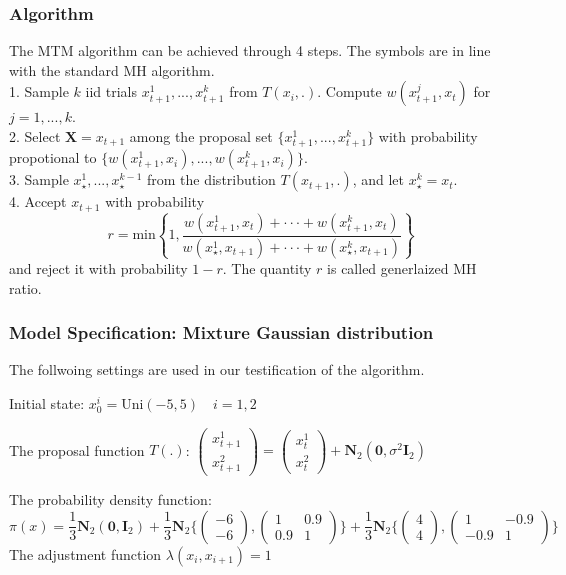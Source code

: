 \documentclass{article} %
\begin{document}
\subsubsection{Algorithm}
The MTM algorithm can be achieved through 4 steps. The symbols are in line with the standard MH algorithm.  \\
1. Sample $k$ iid trials $x_{t+1}^{1},..., x_{t+1}^{k}$ from $T(x_i, .)$. Compute $w(x_{t+1}^{j},x_{t})$ for $j=1,...,k$.\\
2. Select $\mathbf{X} = x_{t+1}$ among the proposal set $\{x_{t+1}^{1},..., x_{t+1}^{k}\}$ with probability propotional to $\{w(x_{t+1}^{1},x_i),...,w(x_{t+1}^{k},x_i)\}$.\\
3. Sample $x_{\star}^{1},...,x_{\star}^{k-1}$ from the distribution $T(x_{t+1},.)$, and let $x_{\star}^{k}=x_{t}$.\\
4. Accept $x_{t+1}$ with probability 
\begin{equation*}
r = \text{min}\left\{ 1, \frac{w(x_{t+1}^{1},x_{t})+\cdot \cdot \cdot+w(x_{t+1}^{k},x_{t})} {w(x_{\star}^{1},x_{t+1})+\cdot \cdot \cdot+w(x_{\star}^{k},x_{t+1})} \right\}
\end{equation*}
and reject it with probability $1-r$. The quantity $r$ is called generlaized MH ratio. 

\subsubsection{Model Specification: Mixture Gaussian distribution}
The follwoing settings are used in our testification of the algorithm.

Initial state: 
$x_0^{i} = \text{Uni}(-5,5)\quad i = 1,2$

The proposal function $T(.)$:
$
\left(\begin{array}{c}
x_{t+1}^{1}  \\
x_{t+1}^{2} 
\end{array}
\right) = \left(\begin{array}{c}
x_{t}^{1}  \\
x_{t}^{2} 
\end{array}
\right)+\mathbf{N}_2(\mathbf{0},\sigma^2 \mathbf{I}_2)
$

The probability density function:
$$
\pi(x)=\frac{1}{3}\mathbf{N}_2(\mathbf{0},\mathbf{I}_2)+\frac{1}{3}\mathbf{N}_2\biggl\{\left(\begin{array}{c}
-6 \\
-6
\end{array}
\right),\left(\begin{array}{cc}
1 & 0.9 \\
0.9 & 1
\end{array}
\right)
\biggr\}+\frac{1}{3}\mathbf{N}_2\biggl\{\left(\begin{array}{c}
4 \\
4
\end{array}
\right),\left(\begin{array}{cc}
1 & -0.9 \\
-0.9 & 1
\end{array}
\right)
\biggr\}$$
The adjustment function $\lambda (x_i,x_{i+1}) = 1$
\end{document}
